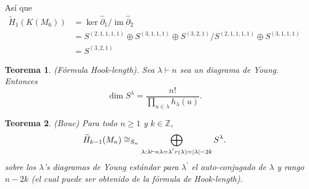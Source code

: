 \documentclass[12pt]{book}
\newtheorem{theorem}{Teorema}[section]
\theoremstyle{definition}
\DeclareMathOperator{\im}{im}
\newcounter{in}
\begin{document}
 Así que
 \begin{align*}
    \widetilde H_{1}(K(M_{6}))&=\ker\widehat\partial_{1}/\im\widehat\partial_{2}\\
    &=S^{(2,1,1,1,1)}\oplus S^{(3,1,1,1)}\oplus S^{(3,2,1)}/S^{(2,1,1,1,1)}\oplus S^{(3,1,1,1)}\\
    &=S^{(3,2,1)}
\end{align*}

\begin{theorem}{(Fórmula Hook-length).} 
  Sea $\lambda\vdash n$ sea un diagrama de Young. Entonces
  $$\dim S^{\lambda}=\frac{n!}{\prod_{u\in \lambda}h_{\lambda}(u)}.$$
\end{theorem}
 
\begin{theorem}(Bouc)
  Para todo $n\geq1$ y $k\in \mathbb{Z}$,
  \begin{equation*}
    \widetilde H_{k-1}(M_{n})\cong_{S_{n}}\bigoplus_{\lambda:\lambda\vdash n\\
      \lambda=\lambda^{'}\\r(\lambda)=\mid \lambda \mid-2k} S^{\lambda}.
  \end{equation*}
  sobre los $\lambda$'s diagramas de Young estándar para $\lambda^{'}$
  el auto-conjugado de $\lambda$ y rango $n-2k$ (el cual puede ser
  obtenido de la fórmula de Hook-length).
\end{theorem}



% 

% 

\printindex
\end{document}

